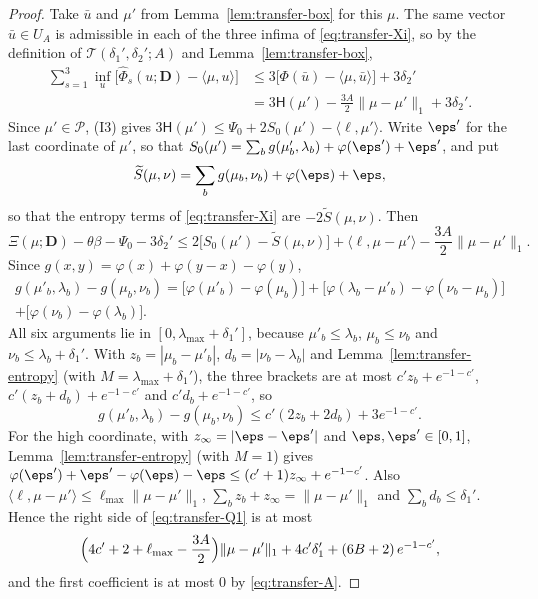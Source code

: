\begin{proof}
Take $\bar u$ and $\mu'$ from Lemma~\ref{lem:transfer-box} for this $\mu$. The same vector
$\bar u\in U_A$ is admissible in each of the three infima of \eqref{eq:transfer-Xi}, so by the
definition of $\mathcal T(\delta_1',\delta_2';A)$ and Lemma~\ref{lem:transfer-box},
\begin{align*}
\sum_{s=1}^3\inf_u\bigl[\widehat\Phi_s(u;\mathbf D)-\langle\mu,u\rangle\bigr]
&\le3\bigl[\Phi(\bar u)-\langle\mu,\bar u\rangle\bigr]+3\delta_2'\\
&=3\mathsf H(\mu')-\frac{3A}{2}\|\mu-\mu'\|_1+3\delta_2' .
\end{align*}
Since $\mu'\in\mathcal P$, (I3) gives
$3\mathsf H(\mu')\le\Psi_0+2S_0(\mu')-\langle\ell,\mu'\rangle$. Write $\eps'$ for the last
coordinate of $\mu'$, so that $S_0(\mu')=\sum_bg(\mu'_b,\lambda_b)+\varphi(\eps')+\eps'$, and
put
\[
\widetilde S(\mu,\nu)=\sum_bg(\mu_b,\nu_b)+\varphi(\eps)+\eps ,
\]
so that the entropy terms of \eqref{eq:transfer-Xi} are $-2\widetilde S(\mu,\nu)$. Then
\begin{equation}\label{eq:transfer-Q1}
\Xi(\mu;\mathbf D)-\theta\beta-\Psi_0-3\delta_2'
\le2\bigl[S_0(\mu')-\widetilde S(\mu,\nu)\bigr]+\langle\ell,\mu-\mu'\rangle-\frac{3A}{2}\|\mu-\mu'\|_1 .
\end{equation}
Since $g(x,y)=\varphi(x)+\varphi(y-x)-\varphi(y)$,
\begin{multline*}
g(\mu'_b,\lambda_b)-g(\mu_b,\nu_b)
=\bigl[\varphi(\mu'_b)-\varphi(\mu_b)\bigr]+\bigl[\varphi(\lambda_b-\mu'_b)-\varphi(\nu_b-\mu_b)\bigr]\\
+\bigl[\varphi(\nu_b)-\varphi(\lambda_b)\bigr].
\end{multline*}
All six arguments lie in $[0,\lambda_{\max}+\delta_1']$, because $\mu'_b\le\lambda_b$,
$\mu_b\le\nu_b$ and $\nu_b\le\lambda_b+\delta_1'$. With $z_b=|\mu_b-\mu'_b|$,
$d_b=|\nu_b-\lambda_b|$ and Lemma~\ref{lem:transfer-entropy} (with
$M=\lambda_{\max}+\delta_1'$), the three brackets are at most $c'z_b+e^{-1-c'}$,
$c'(z_b+d_b)+e^{-1-c'}$ and $c'd_b+e^{-1-c'}$, so
\[
g(\mu'_b,\lambda_b)-g(\mu_b,\nu_b)\le c'(2z_b+2d_b)+3e^{-1-c'}.
\]
For the high coordinate, with $z_\infty=|\eps-\eps'|$ and $\eps,\eps'\in[0,1]$,
Lemma~\ref{lem:transfer-entropy} (with $M=1$) gives
$\varphi(\eps')+\eps'-\varphi(\eps)-\eps\le(c'+1)z_\infty+e^{-1-c'}$. Also
$\langle\ell,\mu-\mu'\rangle\le\ell_{\max}\|\mu-\mu'\|_1$,
$\sum_bz_b+z_\infty=\|\mu-\mu'\|_1$ and $\sum_bd_b\le\delta_1'$. Hence the right side of
\eqref{eq:transfer-Q1} is at most
\[
\Bigl(4c'+2+\ell_{\max}-\frac{3A}{2}\Bigr)\|\mu-\mu'\|_1+4c'\delta_1'+(6B+2)\,e^{-1-c'},
\]
and the first coefficient is at most $0$ by \eqref{eq:transfer-A}.
\end{proof}

